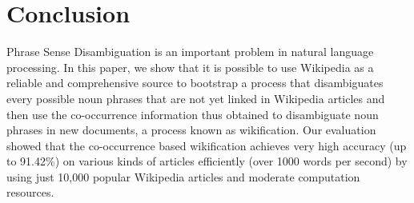 \section{Conclusion}
\label{sec:conclude}
Phrase Sense Disambiguation is an important problem in
natural language processing.
In this paper, we show that it is possible to use Wikipedia
as a reliable and comprehensive source to bootstrap a process that
disambiguates every possible noun phrases that are not yet linked
in Wikipedia articles and then use the co-occurrence
information thus obtained to disambiguate noun phrases in new documents,
a process known as wikification.
Our evaluation showed that the co-occurrence based wikification achieves
very high accuracy (up to 91.42\%) on various kinds of articles
efficiently (over 1000 words per second) by using just 10,000 popular
Wikipedia articles and moderate computation resources.
